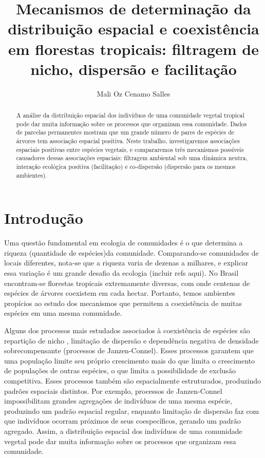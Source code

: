 \documentclass[twoside,12pt,a4paper]{report}
\begin{document}
\title{Mecanismos de determinação da distribuição espacial e coexistência em florestas tropicais:
filtragem de nicho, dispersão e facilitação}
\author{Mali Oz Cenamo Salles}


\begin{abstract}

A análise da distribuição espacial dos indivíduos de uma comunidade vegetal tropical pode dar muita
informação sobre os processos que organizam essa comunidade. Dados de parcelas permanentes mostram
que um grande número de pares de espécies de árvores tem associação espacial positiva. Neste
trabalho, investigaremos associações espaciais positivas entre espécies vegetais, e compararemos
três mecanismos possíveis causadores dessas associações espaciais: filtragem ambiental sob uma
dinâmica neutra, interação ecológica positiva (facilitação) e co-dispersão (dispersão para os mesmos
ambientes).

\end{abstract}

\section{Introdução}

Uma questão fundamental em ecologia de comunidades é o que determina a riqueza (quantidade de
espécies)da
comunidade. Comparando-se comunidades de
locais diferentes, nota-se que a riqueza varia de
dezenas a milhares, e explicar essa variação é um grande desafio da ecologia (incluir refs
aqui). No Brasil encontram-se florestas tropicais extremamente diversas, com onde centenas de
espécies de árvores coexistem em cada hectar. Portanto, temos ambientes propícios ao estudo dos mecanismos
que permitem a coexistência de muitas espécies em uma mesma comunidade.

Alguns dos processos mais estudados associados à coexistência de espécies são repartição de
nicho \citep{refs}, limitação de dispersão \citep{refs} e dependência negativa de densidade sobrecompensante
(processos de Janzen-Connel)\citep{refs}. 
Esses processos garantem que uma população limite seu próprio crescimento mais do que limita o
crescimento de populações de outras espécies, o que limita a possibilidade de exclusão
competitiva. 
Esses processos também são espacialmente
estruturados, produzindo padrões espaciais distintos. Por exemplo, processos de
Janzen-Connel impossibilitam grandes agregações de indivíduos de uma mesma espécie,
produzindo um padrão espacial regular, enquanto limitação de dispersão faz com que
indivíduos ocorram próximos de seus coespecíficos, gerando um padrão agregado.
Assim, a distribuição espacial dos indivíduos de uma comunidade vegetal pode dar muita
informação sobre os processos que organizam essa comunidade. 
\end{document}
